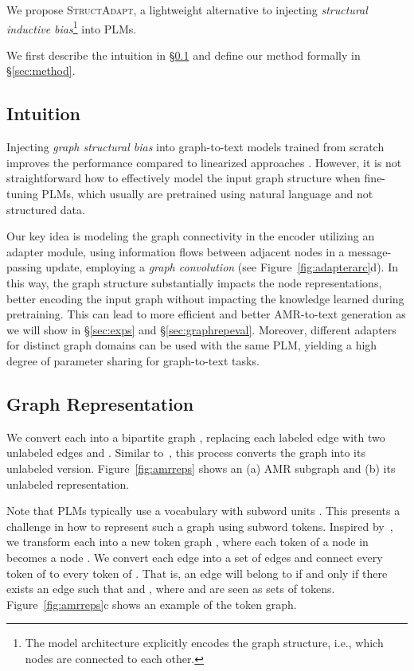 \documentclass[11pt]{article}
\newcommand{\graphadapter}{{\small\textsc{StructAdapt}}\xspace}
\begin{document}
We propose \graphadapter, a lightweight alternative to injecting \emph{structural inductive bias}\footnote{The model architecture explicitly encodes the graph structure, i.e., which nodes are connected to each other.} into PLMs.

We first describe the intuition in \S\ref{sec:intuition} and define our method formally in \S\ref{sec:method}.


\subsection{Intuition}
\label{sec:intuition}

Injecting \emph{graph structural bias} into graph-to-text models trained from scratch improves the performance compared to linearized approaches \cite{damonte-cohen-2019-structural, ribeiro-etal-2019-enhancing}. However, it is not straightforward how to effectively model the input graph structure when fine-tuning PLMs, which usually are pretrained using natural language and not structured data. 

Our key idea is modeling the graph connectivity in the encoder utilizing an adapter module, using information flows between adjacent nodes in a message-passing update, employing a \emph{graph convolution} (see Figure~\ref{fig:adapterarc}d). In this way, the graph structure substantially impacts the node representations, better encoding the input graph without impacting the knowledge learned during pretraining. This can lead to more efficient and better AMR-to-text generation as we will show in \S\ref{sec:exps} and \S\ref{sec:graphrepeval}. Moreover, different adapters for distinct graph domains can be used with the same PLM, yielding a high degree of parameter sharing for graph-to-text tasks.


\subsection{Graph Representation}
\label{sec:graphrep}
We convert each  into a bipartite graph , replacing each labeled edge  with two unlabeled edges  and . Similar to~\citet{beck-etal-2018-graph}, this process converts the graph into its unlabeled version. Figure~\ref{fig:amrreps} shows an (a) AMR subgraph and (b) its unlabeled representation.

Note that PLMs typically use a vocabulary with subword units \cite{sennrich-etal-2016-neural}. This presents a challenge in how to represent such a graph using subword tokens. Inspired by~\citet{ribeiro2020modeling}, we transform each  into a new token graph , where each token of a node in  becomes a node . We convert each edge  into a set of edges and connect every token of  to every token of . That is, an edge  will belong to  if and only if there exists an edge  such that  and , where  and  are seen as sets of tokens. Figure~\ref{fig:amrreps}c shows an example of the token graph.
\end{document}
